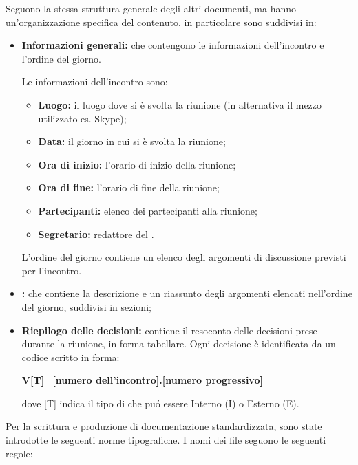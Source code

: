         Seguono la stessa struttura generale degli altri documenti, ma hanno un'organizzazione specifica del contenuto, in particolare sono suddivisi in:
        \begin{itemize}
          \item \textbf{Informazioni generali:} che contengono le informazioni dell'incontro e l'ordine del giorno.

             Le informazioni dell'incontro sono:
               \begin{itemize}
                 \item \textbf{Luogo:} il luogo dove si è svolta la riunione (in alternativa il mezzo utilizzato es. Skype);
                 \item \textbf{Data:} il giorno in cui si è svolta la riunione;
                 \item \textbf{Ora di inizio:} l'orario di inizio della riunione;
                 \item \textbf{Ora di fine:} l'orario di fine della riunione;
                 \item \textbf{Partecipanti:} elenco dei partecipanti alla riunione;
                 \item \textbf{Segretario:} redattore del \Verbale{}.
               \end{itemize}
			L'ordine del giorno contiene un elenco degli argomenti di discussione previsti per l'incontro.
          \item \textbf{\Verbale{}}\textbf{:} che contiene la descrizione e un riassunto degli argomenti elencati nell'ordine del giorno, suddivisi in sezioni;
          \item \textbf{Riepilogo delle decisioni:} contiene il resoconto delle decisioni prese durante la riunione, in forma tabellare. Ogni decisione è identificata da un codice scritto in forma:
          \begin{center}
            \textbf{V[T]\_[numero dell'incontro].[numero progressivo]}
          \end{center}
          dove [T] indica il tipo di \Verbale{} che puó essere Interno (I) o Esterno (E).
        \end{itemize}
		Per la scrittura e produzione di documentazione standardizzata, sono state introdotte le seguenti norme tipografiche.
        I nomi dei file seguono le seguenti regole:

